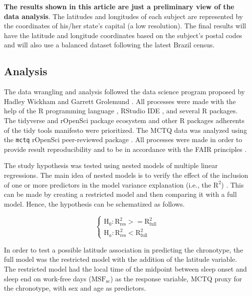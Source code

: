 \documentclass[
12pt,
openright,
oneside,
a4paper,
chapter=TITLE,
section=TITLE,
french,
spanish,
brazil,
english
]{abntex2}\usepackage{array}
\begin{document}
\textbf{The results shown in this article are just a preliminary view of
the data analysis}. The latitudes and longitudes of each subject are
represented by the coordinates of his/her state's capital (a low
resolution). The final results will have the latitude and longitude
coordinates based on the subject's postal codes and will also use a
balanced dataset following the latest Brazil census.

\subsection{Analysis}\label{analysis}

The data wrangling and analysis followed the data science program
proposed by Hadley Wickham and Garrett Grolemund \autocite{wickham2016}.
All processes were made with the help of the R programming language
\autocite{rcoreteam2023}, RStudio IDE \autocite{positteam2023}, and
several R packages. The tidyverse and rOpenSci package ecosystem and
other R packages adherents of the tidy tools manifesto
\autocite{wickham2023a} were prioritized. The MCTQ data was analyzed
using the \texttt{mctq} rOpenSci peer-reviewed package
\autocite{vartanian2023}. All processes were made in order to provide
result reproducibility and to be in accordance with the FAIR principles
\autocite{wilkinson2016}.

The study hypothesis was tested using nested models of multiple linear
regressions. The main idea of nested models is to verify the effect of
the inclusion of one or more predictors in the model variance
explanation (i.e., the \(\text{R}^{2}\)) \autocite{allen1997}. This can
be made by creating a restricted model and then comparing it with a full
model. Hence, the hypothesis can be schematized as follows.

\[
\begin{cases}
\text{H}_{0}: \text{R}^{2}_{\text{res}} >= \text{R}^{2}_{\text{full}} \\
\text{H}_{a}: \text{R}^{2}_{\text{res}} < \text{R}^{2}_{\text{full}}
\end{cases}
\]

\smallskip

In order to test a possible latitude association in predicting the
chronotype, the full model was the restricted model with the addition of
the latitude variable. The restricted model had the local time of the
midpoint between sleep onset and sleep end on work-free days
(\(\text{MSF}_{\text{sc}}\)) as the response variable, MCTQ proxy for
the chronotype, with sex and age as predictors.
\end{document}

